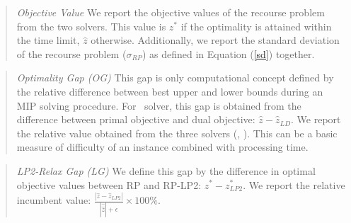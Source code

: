 \begin{quote}
	\noindent\textit{Objective Value} We report the objective values of the recourse problem from the two solvers. This value is $z^*$ if the optimality is attained within the time limit, $\hat{z}$ otherwise. Additionally, we report the standard deviation of the recourse problem ($\sigma_{RP}$) as defined in Equation (\ref{sd}) together.
\end{quote}

\begin{quote}
	\noindent\textit{Optimality Gap (OG)} This gap is only computational concept defined by the relative difference between best upper and lower bounds during an MIP solving procedure. For \dsp\ solver, this gap is obtained from the difference between primal objective and dual objective: $\hat{z}-\hat{z}_{LD}$. We report the relative value obtained from the three solvers (\cplex, \dsp). This can be a basic measure of difficulty of an instance combined with processing time.
\end{quote}

\begin{quote}
	\noindent\textit{LP2-Relax Gap (LG)} We define this gap by the difference in optimal objective values between RP and RP-LP2: $z^*-z^*_{LP2}$. We report the relative incumbent value: $\frac{|\hat{z}-\hat{z}_{LP2}|}{|\hat{\hat{z}}|+\epsilon}\times 100\%$.
	
\end{quote}

